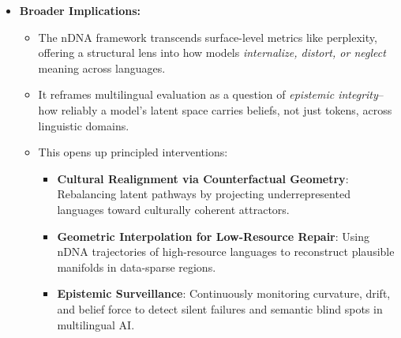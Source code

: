 \begin{itemize}
  \item \textbf{Broader Implications:}
  \begin{itemize}[leftmargin=1.5em]
    \item The nDNA framework transcends surface-level metrics like perplexity, offering a structural lens into how models \emph{internalize, distort, or neglect} meaning across languages.
    \item It reframes multilingual evaluation as a question of \emph{epistemic integrity}--how reliably a model’s latent space carries beliefs, not just tokens, across linguistic domains.
    \item This opens up principled interventions:
    \begin{itemize}
      \item \textbf{Cultural Realignment via Counterfactual Geometry}: Rebalancing latent pathways by projecting underrepresented languages toward culturally coherent attractors.
      \item \textbf{Geometric Interpolation for Low-Resource Repair}: Using nDNA trajectories of high-resource languages to reconstruct plausible manifolds in data-sparse regions.
      \item \textbf{Epistemic Surveillance}: Continuously monitoring curvature, drift, and belief force to detect silent failures and semantic blind spots in multilingual AI.
    \end{itemize}
  \end{itemize}
\end{itemize}



